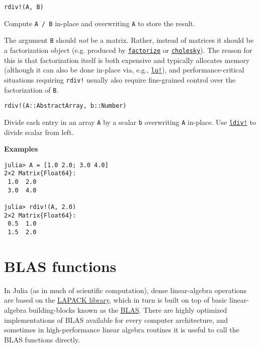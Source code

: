 \begin{adjustwidth}{2em}{0pt}


\begin{verbatim}
rdiv!(A, B)
\end{verbatim}

Compute \texttt{A / B} in-place and overwriting \texttt{A} to store the result.

The argument \texttt{B} should \emph{not} be a matrix.  Rather, instead of matrices it should be a factorization object (e.g. produced by \hyperlink{7042962205548658937}{\texttt{factorize}} or \hyperlink{7653413936706994771}{\texttt{cholesky}}). The reason for this is that factorization itself is both expensive and typically allocates memory (although it can also be done in-place via, e.g., \hyperlink{3268903080173564842}{\texttt{lu!}}), and performance-critical situations requiring \texttt{rdiv!} usually also require fine-grained control over the factorization of \texttt{B}.




\begin{lstlisting}
rdiv!(A::AbstractArray, b::Number)
\end{lstlisting}

Divide each entry in an array \texttt{A} by a scalar \texttt{b} overwriting \texttt{A} in-place.  Use \hyperlink{11817740014578453690}{\texttt{ldiv!}} to divide scalar from left.

\textbf{Examples}


\begin{verbatim}
julia> A = [1.0 2.0; 3.0 4.0]
2×2 Matrix{Float64}:
 1.0  2.0
 3.0  4.0

julia> rdiv!(A, 2.0)
2×2 Matrix{Float64}:
 0.5  1.0
 1.5  2.0
\end{verbatim}



\end{adjustwidth}

\hypertarget{11716155958635895745}{}


\section{BLAS functions}



In Julia (as in much of scientific computation), dense linear-algebra operations are based on the \href{http://www.netlib.org/lapack/}{LAPACK library}, which in turn is built on top of basic linear-algebra building-blocks known as the \href{http://www.netlib.org/blas/}{BLAS}. There are highly optimized implementations of BLAS available for every computer architecture, and sometimes in high-performance linear algebra routines it is useful to call the BLAS functions directly.



